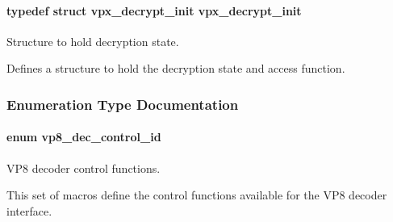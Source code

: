 \paragraph[{\texorpdfstring{vpx\+\_\+decrypt\+\_\+init}{vpx_decrypt_init}}]{\setlength{\rightskip}{0pt plus 5cm}typedef struct {\bf vpx\+\_\+decrypt\+\_\+init}  {\bf vpx\+\_\+decrypt\+\_\+init}}\hypertarget{group__vp8__decoder_gaa55171d8fa453260b1375dba87524b6a}{}\label{group__vp8__decoder_gaa55171d8fa453260b1375dba87524b6a}


Structure to hold decryption state. 

Defines a structure to hold the decryption state and access function. 

\subsubsection{Enumeration Type Documentation}
\paragraph[{\texorpdfstring{vp8\+\_\+dec\+\_\+control\+\_\+id}{vp8_dec_control_id}}]{\setlength{\rightskip}{0pt plus 5cm}enum {\bf vp8\+\_\+dec\+\_\+control\+\_\+id}}\hypertarget{group__vp8__decoder_gaf9dd3f2e6d1412106ee791af768e57c1}{}\label{group__vp8__decoder_gaf9dd3f2e6d1412106ee791af768e57c1}


V\+P8 decoder control functions. 

This set of macros define the control functions available for the V\+P8 decoder interface.

